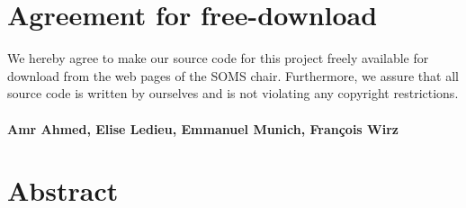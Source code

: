\documentclass[11pt]{article}
\author{Amr Ahmed, Elise Ledieu, Emmanuel Munich, Fran\c{c}ois Wirz}
\begin{document}

\newpage


\newpage
\section*{Agreement for free-download}
\bigskip


\bigskip


\large We hereby agree to make our source code for this project freely available for download from the web pages of the SOMS chair. Furthermore, we assure that all source code is written by ourselves and is not violating any copyright restrictions.

\begin{center}

\bigskip


\bigskip


\paragraph{Amr Ahmed, Elise Ledieu, Emmanuel Munich, Fran\c{c}ois Wirz}

\end{center}
\newpage







\tableofcontents

\newpage




\section{Abstract}
\end{document}
